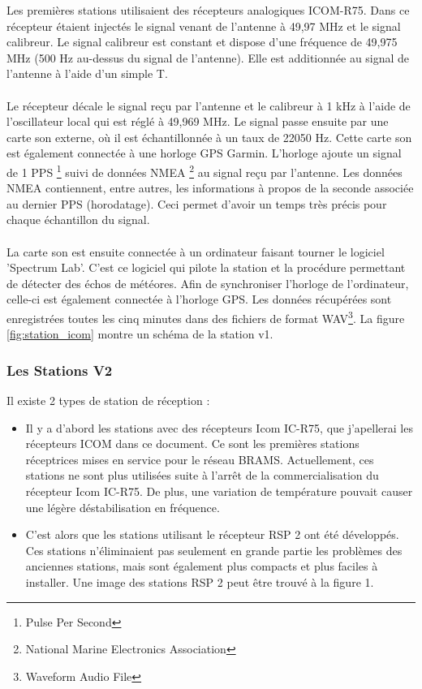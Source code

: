 \documentclass[11pt]{article}
\begin{document}
Les premières stations utilisaient des récepteurs analogiques ICOM-R75.
Dans ce récepteur étaient injectés le signal venant de l'antenne à 49,97 MHz et le signal calibreur.
Le signal calibreur est constant et dispose d'une fréquence de 49,975 MHz (500 Hz au-dessus du signal de l'antenne).
Elle est additionnée au signal de l'antenne à l'aide d'un simple T.\\
\\
Le récepteur décale le signal reçu par l'antenne et le calibreur à 1 kHz à l'aide de l'oscillateur local qui est réglé à 49,969 MHz.
Le signal passe ensuite par une carte son externe, où il est échantillonnée à un taux de 22050 Hz.
Cette carte son est également connectée à une horloge GPS Garmin.
L'horloge ajoute un signal de 1 PPS \footnote{Pulse Per Second} suivi de données NMEA \footnote{National Marine Electronics Association} au signal reçu par l'antenne.
Les données NMEA contiennent, entre autres, les informations à propos de la seconde associée au dernier PPS (horodatage).
Ceci permet d'avoir un temps très précis pour chaque échantillon du signal.\\
\\
La carte son est ensuite connectée à un ordinateur faisant tourner le logiciel 'Spectrum Lab'.
C'est ce logiciel qui pilote la station et la procédure permettant de détecter des échos de météores.
Afin de synchroniser l'horloge de l'ordinateur, celle-ci est également connectée à l'horloge GPS.
Les données récupérées sont enregistrées toutes les cinq minutes dans des fichiers de format WAV\footnote{Waveform Audio File}.
La figure \ref{fig:station_icom} montre un schéma de la station v1.


\subsubsection{Les Stations V2}
Il existe 2 types de station de réception :
\begin{itemize}
    \item Il y a d'abord les stations avec des récepteurs Icom IC-R75, que j'apellerai les récepteurs ICOM dans ce document.
          Ce sont les premières stations réceptrices mises en service pour le réseau BRAMS.
          Actuellement, ces stations ne sont plus utilisées suite à l'arrêt de la commercialisation du récepteur Icom IC-R75.
          De plus, une variation de température pouvait causer une légère déstabilisation en fréquence.
    \item C'est alors que les stations utilisant le récepteur RSP 2 ont été développés.
          Ces stations n'éliminaient pas seulement en grande partie les problèmes des anciennes stations, mais sont également plus compacts et plus faciles à installer.
          Une image des stations RSP 2 peut être trouvé à la figure 1.
\end{itemize}
\end{document}
